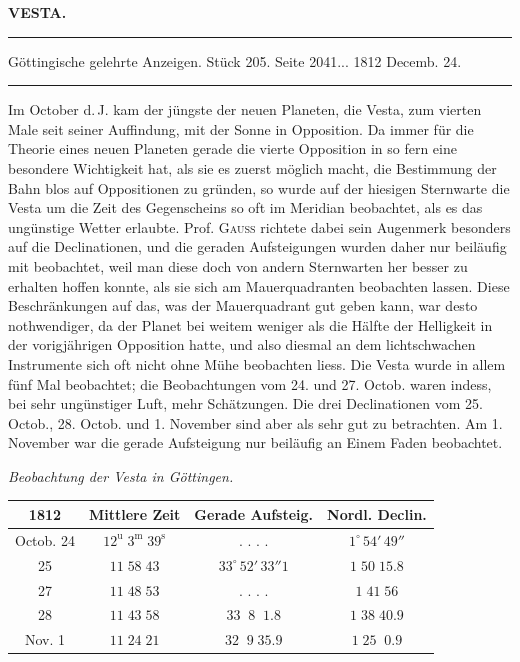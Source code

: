 \clearpage{}\hypertarget{native-366-lower}{}\label{native-366-lower}
\begin{center}\textbf{VESTA.}\par\vspace{4pt}\hrule\vspace{4pt}\fontsize{10}{12}\selectfont Göttingische gelehrte Anzeigen. Stück 205. Seite 2041\;... 1812 Decemb. 24.\par\vspace{4pt}\hrule\vspace{4pt}\end{center}

\par\indent Im October d.\,J. kam der jüngste der neuen Planeten, die Vesta, zum vierten Male seit seiner
Auffindung, mit der Sonne in Opposition. Da immer für die Theorie eines neuen Planeten gerade die
vierte Opposition in so fern eine besondere Wichtigkeit hat, als sie es zuerst möglich macht, die
Bestimmung der Bahn blos auf Oppositionen zu gründen, so wurde auf der hiesigen Sternwarte die Vesta
um die Zeit des Gegenscheins so oft im Meridian beobachtet, als es das ungünstige Wetter erlaubte.
Prof. \textsc{Gauss} richtete dabei sein Augenmerk besonders auf die Declinationen, und die geraden Aufsteigungen wurden daher nur beiläufig mit beobachtet, weil man diese doch von andern Sternwarten her
besser zu erhalten hoffen konnte, als sie sich am Mauerquadranten beobachten lassen. Diese Beschränkungen
auf das, was der Mauerquadrant gut geben kann, war desto nothwendiger, da der Planet bei weitem weniger
als die Hälfte der Helligkeit in der vorigjährigen Opposition hatte, und also diesmal an dem
lichtschwachen Instrumente sich oft nicht ohne Mühe beobachten liess. Die Vesta wurde in allem fünf
Mal beobachtet; die Beobachtungen vom 24. und 27. Octob. waren indess, bei sehr ungünstiger Luft,
mehr Schätzungen. Die drei Declinationen vom 25. Octob., 28. Octob. und 1. November sind aber als
sehr gut zu betrachten. Am 1. November war die gerade Aufsteigung nur beiläufig an Einem Faden
beobachtet.

\medskip
{}\noindent\emph{Beobachtung der Vesta in Göttingen.}

\begin{center}
\fontsize{10}{12}\selectfont\setlength{\tabcolsep}{4pt}\renewcommand{\arraystretch}{1.15}\begin{tabular}{|c|c|c|c|}
\hline
1812 & Mittlere Zeit & Gerade Aufsteig. & Nordl. Declin. \\
\hline
Octob. 24 & $12^{\mathrm u}\;3^{\mathrm m}\;39^{\mathrm s}$ & . . . . & $1^\circ\,54'\,49''$ \\
25 & $11\;58\;43$ & $33^\circ\,52'\,33''1$ & $1\;50\;15.8$ \\
27 & $11\;48\;53$ & . . . . & $1\;41\;56$ \\
28 & $11\;43\;58$ & $33\;\;8\;\;1.8$ & $1\;38\;40.9$ \\
Nov. 1 & $11\;24\;21$ & $32\;\;9\;35.9$ & $1\;25\;\;0.9$ \\
\hline
\end{tabular}
\end{center}

